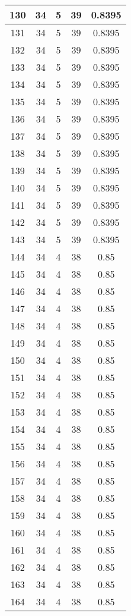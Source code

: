 \documentclass[letterpaper, 12pt]{article}
\begin{document}
\begin{longtable}{|c|c|c|c|c|}
\hline
130 & 34 & 5 & 39 & 0.8395 \\
\hline
131 & 34 & 5 & 39 & 0.8395 \\
\hline
132 & 34 & 5 & 39 & 0.8395 \\
\hline
133 & 34 & 5 & 39 & 0.8395 \\
\hline
134 & 34 & 5 & 39 & 0.8395 \\
\hline
135 & 34 & 5 & 39 & 0.8395 \\
\hline
136 & 34 & 5 & 39 & 0.8395 \\
\hline
137 & 34 & 5 & 39 & 0.8395 \\
\hline
138 & 34 & 5 & 39 & 0.8395 \\
\hline
139 & 34 & 5 & 39 & 0.8395 \\
\hline
140 & 34 & 5 & 39 & 0.8395 \\
\hline
141 & 34 & 5 & 39 & 0.8395 \\
\hline
142 & 34 & 5 & 39 & 0.8395 \\
\hline
143 & 34 & 5 & 39 & 0.8395 \\
\hline
144 & 34 & 4 & 38 & 0.85 \\
\hline
145 & 34 & 4 & 38 & 0.85 \\
\hline
146 & 34 & 4 & 38 & 0.85 \\
\hline
147 & 34 & 4 & 38 & 0.85 \\
\hline
148 & 34 & 4 & 38 & 0.85 \\
\hline
149 & 34 & 4 & 38 & 0.85 \\
\hline
150 & 34 & 4 & 38 & 0.85 \\
\hline
151 & 34 & 4 & 38 & 0.85 \\
\hline
152 & 34 & 4 & 38 & 0.85 \\
\hline
153 & 34 & 4 & 38 & 0.85 \\
\hline
154 & 34 & 4 & 38 & 0.85 \\
\hline
155 & 34 & 4 & 38 & 0.85 \\
\hline
156 & 34 & 4 & 38 & 0.85 \\
\hline
157 & 34 & 4 & 38 & 0.85 \\
\hline
158 & 34 & 4 & 38 & 0.85 \\
\hline
159 & 34 & 4 & 38 & 0.85 \\
\hline
160 & 34 & 4 & 38 & 0.85 \\
\hline
161 & 34 & 4 & 38 & 0.85 \\
\hline
162 & 34 & 4 & 38 & 0.85 \\
\hline
163 & 34 & 4 & 38 & 0.85 \\
\hline
164 & 34 & 4 & 38 & 0.85 \\

\end{longtable}
\end{document}
